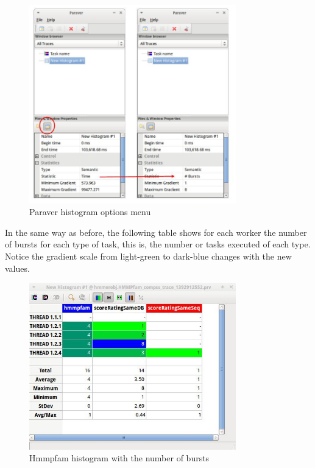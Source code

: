 \begin{figure}[ht!]
  \centering
    \includegraphics[width=0.8\textwidth]{./Sections/4_Tools/Figures/14.jpeg}
    \caption{Paraver histogram options menu}
\end{figure}

\newpage
In the same way as before, the following table shows for each worker the number of bursts 
for each type of task, this is, the number or tasks executed of each type. Notice the gradient 
scale from light-green to dark-blue changes with the new values.

\begin{figure}[ht!]
  \centering
    \includegraphics[width=0.8\textwidth]{./Sections/4_Tools/Figures/15.jpeg}
    \caption{Hmmpfam histogram with the number of bursts}
\end{figure}

